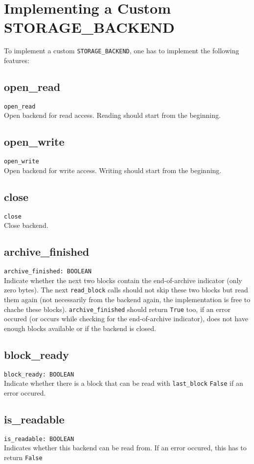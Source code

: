 \section{Implementing a Custom STORAGE\_BACKEND}
To implement a custom \lstinline;STORAGE_BACKEND;, one has to implement the
following features:

\subsection{open\_read}
\lstinline;open_read;\\
Open backend for read access. Reading should start from the beginning.

\subsection{open\_write}
\lstinline;open_write;\\
Open backend for write access. Writing should start from the beginning.

\subsection{close}
\lstinline;close;\\
Close backend.

\subsection{archive\_finished}
\lstinline;archive_finished: BOOLEAN;\\
Indicate whether the next two blocks contain the end-of-archive indicator
(only zero bytes). The next \lstinline;read_block; calls should not skip these
two blocks but read them again (not necessarily from the backend again, the
implementation is free to chache these blocks).
\lstinline;archive_finished; should return \lstinline;True; too, if an error
occured (or occurs while checking for the end-of-archive indicator), does not
have enough blocks available or if the backend is closed.

\subsection{block\_ready}
\lstinline;block_ready: BOOLEAN;\\
Indicate whether there is a block that can be read with \lstinline;last_block;
\lstinline;False; if an error occured.


\subsection{is\_readable}
\lstinline;is_readable: BOOLEAN;\\
Indicates whether this backend can be read from. If an error occured, this has
to return \lstinline;False;

